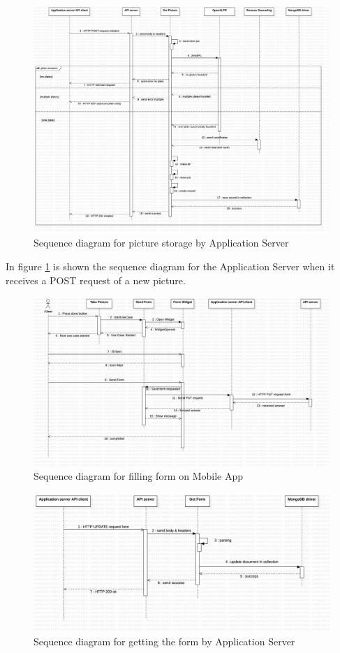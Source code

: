 \begin{figure}[H]
\centering
\includegraphics[width=\textwidth]{Images/DDSeqSeverPic.png}
\caption{\label{fig:DDSeqSeverPic} Sequence diagram for picture storage by Application Server}
\end{figure}
In figure \ref{fig:DDSeqSeverPic} is shown the sequence diagram for the Application Server when it receives a POST request of a new picture.


\begin{figure}[H]
\centering
\includegraphics[width=\textwidth]{Images/DDSeqAppForm.png}
\caption{\label{fig:DDSeqAppForm} Sequence diagram for filling form on Mobile App}
\end{figure}

\begin{figure}[H]
\centering
\includegraphics[width=\textwidth]{Images/DDSeqSeverForm.png}
\caption{\label{fig:DDSeqSeverForm} Sequence diagram for getting the form by Application Server}
\end{figure}


